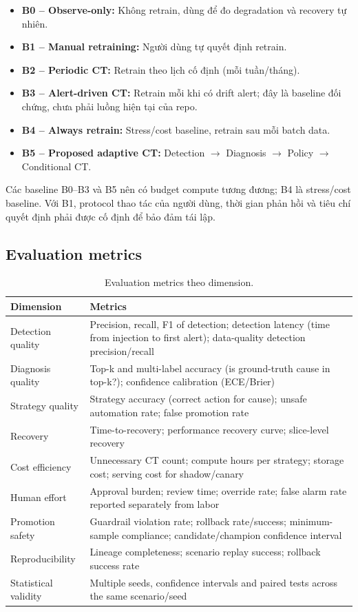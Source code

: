 \documentclass[11pt,a4paper]{article}
\begin{document}
\begin{itemize}
  \item \textbf{B0 -- Observe-only:} Không retrain, dùng để đo degradation và recovery tự nhiên.
  \item \textbf{B1 -- Manual retraining:} Người dùng tự quyết định retrain.
  \item \textbf{B2 -- Periodic CT:} Retrain theo lịch cố định (mỗi tuần/tháng).
  \item \textbf{B3 -- Alert-driven CT:} Retrain mỗi khi có drift alert; đây là baseline đối chứng, chưa phải luồng hiện tại của repo.
  \item \textbf{B4 -- Always retrain:} Stress/cost baseline, retrain sau mỗi batch data.
  \item \textbf{B5 -- Proposed adaptive CT:} Detection $\rightarrow$ Diagnosis $\rightarrow$ Policy $\rightarrow$ Conditional CT.
\end{itemize}

Các baseline B0--B3 và B5 nên có budget compute tương đương; B4 là stress/cost baseline. Với B1, protocol thao tác của người dùng, thời gian phản hồi và tiêu chí quyết định phải được cố định để bảo đảm tái lập.

\subsection{Evaluation metrics}

\begin{table}[ht]
\centering
\small
\caption{Evaluation metrics theo dimension.}
\begin{tabularx}{\linewidth}{@{}p{2.5cm} Y@{}}
\toprule
\textbf{Dimension} & \textbf{Metrics} \\
\midrule
Detection quality & Precision, recall, F1 of detection; detection latency (time from injection to first alert); data-quality detection precision/recall \\
Diagnosis quality & Top-k and multi-label accuracy (is ground-truth cause in top-k?); confidence calibration (ECE/Brier) \\
Strategy quality & Strategy accuracy (correct action for cause); unsafe automation rate; false promotion rate \\
Recovery & Time-to-recovery; performance recovery curve; slice-level recovery \\
Cost efficiency & Unnecessary CT count; compute hours per strategy; storage cost; serving cost for shadow/canary \\
Human effort & Approval burden; review time; override rate; false alarm rate reported separately from labor \\
Promotion safety & Guardrail violation rate; rollback rate/success; minimum-sample compliance; candidate/champion confidence interval \\
Reproducibility & Lineage completeness; scenario replay success; rollback success rate \\
Statistical validity & Multiple seeds, confidence intervals and paired tests across the same scenario/seed \\
\bottomrule
\end{tabularx}
\end{table}
\end{document}
